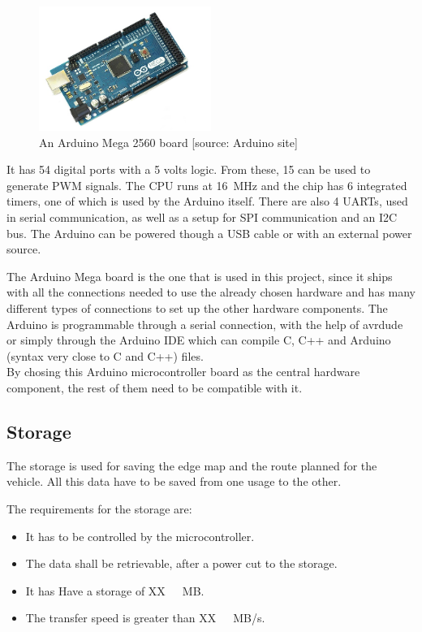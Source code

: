 \begin{figure}[H]
	\centering
	\includegraphics[width=0.5\textwidth]{figures/ArduinoMega.png}
		\caption{An Arduino Mega 2560 board [source: Arduino site]} 
	\label{ArduinoMega}
\end{figure}
%
It has \si{54} digital ports with a 5 volts logic. From these, \si{15} can be used to generate PWM signals. The CPU runs at \si{16 MHz} and the chip has \si{6} integrated timers, one of which is used by the Arduino itself. There are also 4 UARTs, used in serial communication, as well as a setup for SPI communication and an I2C bus. The Arduino can be powered though a USB cable or with an external power source.

The Arduino Mega board is the one that is used in this project, since it ships with all the connections needed to use the already chosen hardware and has many different types of connections to set up the other hardware components. The Arduino is programmable through a serial connection, with the help of avrdude\cite{Avrdude} or simply through the Arduino IDE\cite{ArduinoIDE} which can compile C, C++ and Arduino (syntax very close to C and C++) files.\\
%
By chosing this Arduino microcontroller board as the central hardware component, the rest of them need to be compatible with it.


\subsection{Storage}
The storage is used for saving the edge map and the route planned for the vehicle. All this data have to be saved from one usage to the other.

The requirements for the storage are:
\begin{itemize}
\item It has to be controlled by the microcontroller.
\item The data shall be retrievable, after a power cut to the storage.
\item It has Have a storage of \si{XX\ MB}. 
\item The transfer speed is greater than \si{XX\ MB/s}. 
\end{itemize}

